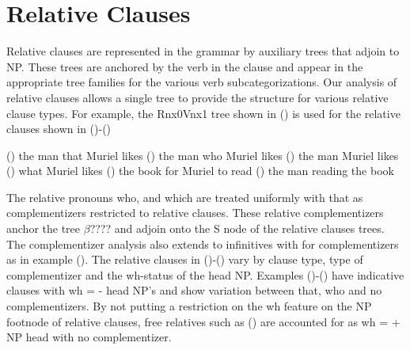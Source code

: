 \section{Relative Clauses}
Relative clauses are represented in the grammar by auxiliary trees
that adjoin to NP. These trees are anchored by the verb in the clause
and appear in the appropriate tree families for the various verb
subcategorizations. Our analysis of relative clauses allows a single
tree to provide the structure for various relative clause types. For
example, the Rnx0Vnx1 tree shown in () is used for the relative
clauses shown in ()-()


	() the man that Muriel likes
	() the man who Muriel likes
	() the man Muriel likes
	() what Muriel likes
	() the book for Muriel to read
	() the man reading the book

The relative pronouns who, and which are treated uniformly with that
as complementizers restricted to relative clauses. These relative
complementizers anchor the tree $\beta$???? and adjoin onto the S node
of the relative clauses trees.  The complementizer
analysis also extends to infinitives with for complementizers as in
example ().  
The relative clauses in ()-() vary by clause type, type of complementizer
and the wh-status of the head NP.  Examples ()-() have indicative
clauses with wh = - head NP's and show variation between that, who and
no complementizers.   
By not putting a restriction on the wh feature on the NP footnode of
relative clauses, free relatives such as () are accounted for as wh =
+ NP head with no complementizer.

